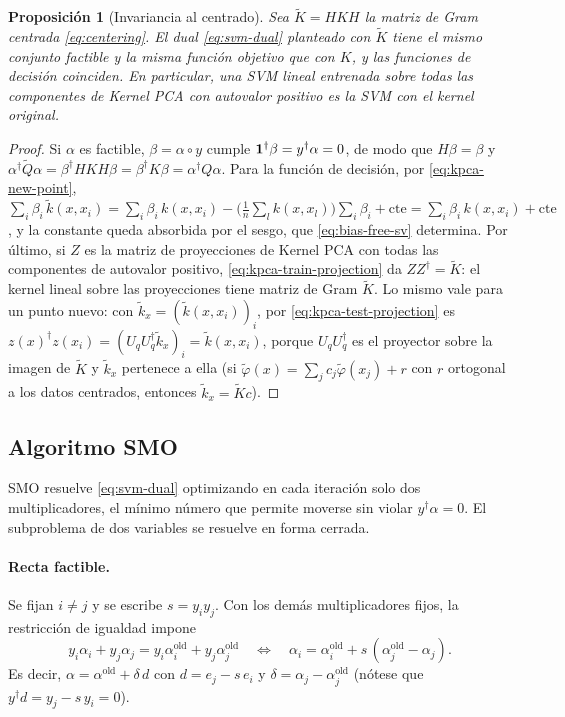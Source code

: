 \documentclass[11pt,a4paper]{article}
\newcommand{\dg}{\dagger}                         %
\newcommand{\Kc}{\widetilde{K}}                   %
\theoremstyle{plain}
\newtheorem{proposicion}[teorema]{Proposición}
\theoremstyle{definition}
\theoremstyle{remark}
\numberwithin{equation}{section}
\begin{document}
\begin{proposicion}[Invariancia al centrado]\label{prop:invariancia}
Sea $\Kc=HKH$ la matriz de Gram centrada \eqref{eq:centering}. El dual \eqref{eq:svm-dual}
planteado con $\Kc$ tiene el mismo conjunto factible y la misma función objetivo que con $K$,
y las funciones de decisión coinciden. En particular, una SVM lineal entrenada sobre todas
las componentes de Kernel PCA con autovalor positivo es la SVM con el kernel original.
\end{proposicion}
\begin{proof}
Si $\alpha$ es factible, $\beta=\alpha\circ y$ cumple $\ones^{\dg}\beta=y^{\dg}\alpha=0$, de
modo que $H\beta=\beta$ y
$\alpha^{\dg}\widetilde Q\alpha=\beta^{\dg}HKH\beta=\beta^{\dg}K\beta=\alpha^{\dg}Q\alpha$.
Para la función de decisión, por \eqref{eq:kpca-new-point},
$\sum_i\beta_i\,\tilde k(x,x_i)=\sum_i\beta_i\,k(x,x_i)
-\bigl(\tfrac1n\sum_lk(x,x_l)\bigr)\sum_i\beta_i+\text{cte}
=\sum_i\beta_i\,k(x,x_i)+\text{cte}$, y la constante queda absorbida por el sesgo, que
\eqref{eq:bias-free-sv} determina. Por último, si $Z$ es la matriz de proyecciones de
Kernel PCA con todas las componentes de autovalor positivo, \eqref{eq:kpca-train-projection}
da $ZZ^{\dg}=\Kc$: el kernel lineal sobre las proyecciones tiene matriz de Gram $\Kc$. Lo
mismo vale para un punto nuevo: con $\tilde k_x=(\tilde k(x,x_i))_{i}$, por
\eqref{eq:kpca-test-projection} es $z(x)^{\dg}z(x_i)=(U_qU_q^{\dg}\tilde k_x)_i
=\tilde k(x,x_i)$, porque $U_qU_q^{\dg}$ es el proyector sobre la imagen de $\Kc$ y
$\tilde k_x$ pertenece a ella (si $\tilde\varphi(x)=\sum_jc_j\tilde\varphi(x_j)+r$ con
$r$ ortogonal a los datos centrados, entonces $\tilde k_x=\Kc c$).
\end{proof}

\subsection{Algoritmo SMO}\label{sec:smo}

SMO \cite{platt1998} resuelve \eqref{eq:svm-dual} optimizando en cada iteración solo dos
multiplicadores, el mínimo número que permite moverse sin violar $y^{\dg}\alpha=0$. El
subproblema de dos variables se resuelve en forma cerrada.

\paragraph{Recta factible.} Se fijan $i\ne j$ y se escribe $s=y_iy_j$. Con los demás
multiplicadores fijos, la restricción de igualdad impone
\begin{equation}\label{eq:smo-line}
  y_i\alpha_i+y_j\alpha_j=y_i\alpha_i^{\mathrm{old}}+y_j\alpha_j^{\mathrm{old}}
  \quad\iff\quad\alpha_i=\alpha_i^{\mathrm{old}}+s\,(\alpha_j^{\mathrm{old}}-\alpha_j).
\end{equation}
Es decir, $\alpha=\alpha^{\mathrm{old}}+\delta\,d$ con $d=e_j-s\,e_i$ y
$\delta=\alpha_j-\alpha_j^{\mathrm{old}}$ (nótese que $y^{\dg}d=y_j-s\,y_i=0$).
\end{document}
